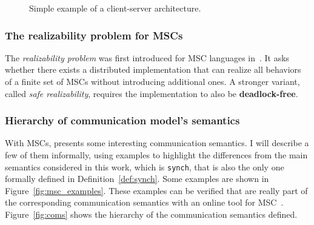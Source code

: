 \begin{figure}[!ht]
\centering
\begin{msc}[draw frame=none, draw head=none, msc keyword=, head height=0px, label distance=0.5ex, foot height=0px, foot distance=0px]{}

	\nextlevel
\end{msc}
\caption{Simple example of a client-server architecture.}
\label{fig:msc-cli-ser}
\end{figure}


\subsubsection{The realizability problem for MSCs}

The \emph{realizability problem} was first introduced for MSC languages 
in~\cite{alur2000inference,alur2003inference}. It asks whether there exists a distributed 
implementation that can realize all behaviors of a finite set of MSCs 
without introducing additional ones. A stronger variant, called 
\emph{safe realizability}, requires the implementation to also be \textbf{deadlock-free}. 

\subsubsection{Hierarchy of communication model's semantics}
With MSCs, \cite{di2023partial} presents some interesting communication
semantics. I will describe a few of them informally, using examples to
highlight the differences from the main semantics considered in this work,
which is \verb|synch|, that is also the only one formally defined in 
Definition~\ref{def:synch}. Some examples are
shown in Figure~\ref{fig:msc_examples}. These examples can be verified that 
are really part of the corresponding communication semantics with an online
tool for MSC~\cite{MSCTool}. Figure~\ref{fig:coms} shows the hierarchy
of the communication semantics defined. %

